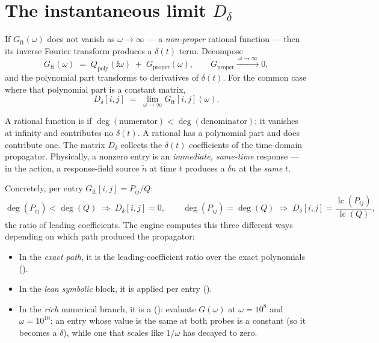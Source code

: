 \section{The instantaneous limit \texorpdfstring{$D_\delta$}{D-delta}}

If $G_{\mathrm{ft}}(\omega)$ does not vanish as $\omega \to \infty$ --- a
\emph{non-proper} rational function --- then its inverse Fourier transform
produces a $\delta(t)$ term. Decompose
\begin{equation}
  G_{\mathrm{ft}}(\omega) \;=\; Q_{\mathrm{poly}}(\ii\omega)
  \;+\; G_{\mathrm{proper}}(\omega),
  \qquad
  G_{\mathrm{proper}} \xrightarrow{\;\omega\to\infty\;} 0,
\end{equation}
and the polynomial part transforms to derivatives of $\delta(t)$. For the common
case where that polynomial part is a constant matrix,
\begin{equation}
  D_\delta[i,j] \;=\; \lim_{\omega\to\infty} G_{\mathrm{ft}}[i,j](\omega).
  \label{eq:Ddelta}
\end{equation}

\begin{defn}
A rational function is  if $\deg(\text{numerator}) <
\deg(\text{denominator})$; it vanishes at infinity and contributes no $\delta(t)$.
A  rational has a polynomial part and does contribute one. The
matrix $D_\delta$ collects the $\delta(t)$ coefficients of the time-domain
propagator. Physically, a nonzero entry is an \emph{immediate, same-time}
response --- in the \msrjd{} action, a response-field source $\tilde n$ at time
$t$ produces a $\delta n$ at the \emph{same} $t$.
\end{defn}

Concretely, per entry $G_{\mathrm{ft}}[i,j] = P_{ij}/Q$:
\[
  \deg(P_{ij}) < \deg(Q) \;\Rightarrow\; D_\delta[i,j] = 0,
  \qquad
  \deg(P_{ij}) = \deg(Q) \;\Rightarrow\; D_\delta[i,j] =
  \frac{\operatorname{lc}(P_{ij})}{\operatorname{lc}(Q)},
\]
the ratio of leading coefficients. The engine computes this three different ways
depending on which path produced the propagator:

\begin{itemize}
  \item In the \emph{exact path}, it is the leading-coefficient ratio over the
        exact polynomials ().
  \item In the \emph{lean symbolic} block, it is 
        applied per entry ().
  \item In the \emph{rich} numerical branch, it is a 
        (): evaluate $G(\omega)$ at $\omega =
        10^8$ and $\omega = 10^{10}$; an entry whose value is the same at both
        probes is a constant (so it becomes a $\delta$), while one that scales like
        $1/\omega$ has decayed to zero.
\end{itemize}

